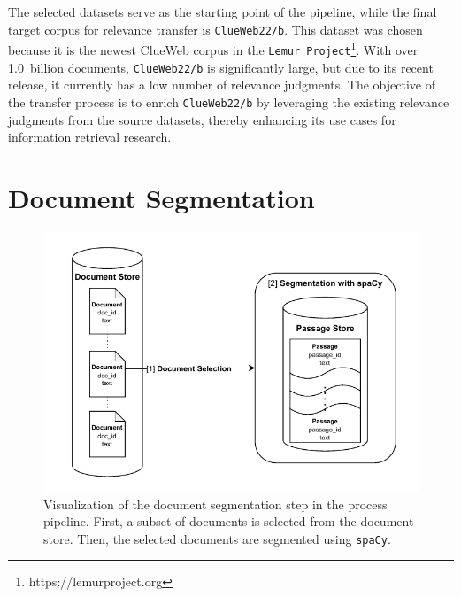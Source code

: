 \\\\
The selected datasets serve as the starting point of the pipeline, while the final target corpus for relevance transfer is \texttt{ClueWeb22/b}. This dataset was chosen because it is the newest ClueWeb corpus in the \texttt{Lemur Project}\footnote{https://lemurproject.org}. With over 1.0~billion documents, \texttt{ClueWeb22/b} is significantly large, but due to its recent release, it currently has a low number of relevance judgments. The objective of the transfer process is to enrich \texttt{ClueWeb22/b} by leveraging the existing relevance judgments from the source datasets, thereby enhancing its use cases for information retrieval research.
\pagebreak


\section{Document Segmentation}\label{document-segmentation}

\begin{figure}[t]
    \centering
    \includegraphics[width=\textwidth]{./graphics/drawio/document_segmentation.pdf}
    \caption{Visualization of the document segmentation step in the process pipeline. First, a subset of documents is selected from the document store. Then, the selected documents are segmented using \texttt{spaCy}.}
    \label{fig:document-segmentation}
\end{figure}


